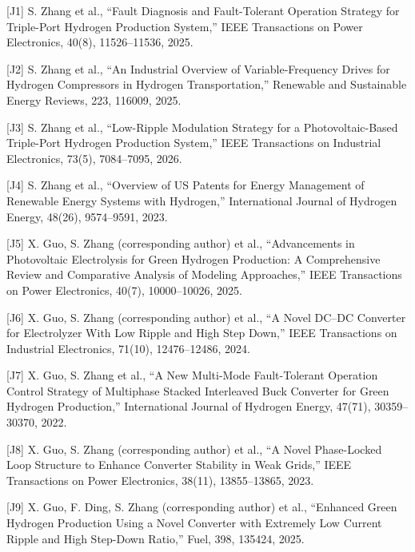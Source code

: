 \documentclass[10pt,a4paper]{article}
\begin{document}
[J1] S. Zhang et al., “Fault Diagnosis and Fault-Tolerant Operation Strategy for Triple-Port Hydrogen Production System,” IEEE Transactions on Power Electronics, 40(8), 11526–11536, 2025.\par

[J2] S. Zhang et al., “An Industrial Overview of Variable-Frequency Drives for Hydrogen Compressors in Hydrogen Transportation,” Renewable and Sustainable Energy Reviews, 223, 116009, 2025.\par

[J3] S. Zhang et al., “Low-Ripple Modulation Strategy for a Photovoltaic-Based Triple-Port Hydrogen Production System,” IEEE Transactions on Industrial Electronics, 73(5), 7084–7095, 2026.\par

[J4] S. Zhang et al., “Overview of US Patents for Energy Management of Renewable Energy Systems with Hydrogen,” International Journal of Hydrogen Energy, 48(26), 9574–9591, 2023.\par

[J5] X. Guo, S. Zhang (corresponding author) et al., “Advancements in Photovoltaic Electrolysis for Green Hydrogen Production: A Comprehensive Review and Comparative Analysis of Modeling Approaches,” IEEE Transactions on Power Electronics, 40(7), 10000–10026, 2025.\par

[J6] X. Guo, S. Zhang (corresponding author) et al., “A Novel DC–DC Converter for Electrolyzer With Low Ripple and High Step Down,” IEEE Transactions on Industrial Electronics, 71(10), 12476–12486, 2024.\par

[J7] X. Guo, S. Zhang et al., “A New Multi-Mode Fault-Tolerant Operation Control Strategy of Multiphase Stacked Interleaved Buck Converter for Green Hydrogen Production,” International Journal of Hydrogen Energy, 47(71), 30359–30370, 2022.\par

[J8] X. Guo, S. Zhang (corresponding author) et al., “A Novel Phase-Locked Loop Structure to Enhance Converter Stability in Weak Grids,” IEEE Transactions on Power Electronics, 38(11), 13855–13865, 2023.\par

[J9] X. Guo, F. Ding, S. Zhang (corresponding author) et al., “Enhanced Green Hydrogen Production Using a Novel Converter with Extremely Low Current Ripple and High Step-Down Ratio,” Fuel, 398, 135424, 2025.\par
\end{document}
